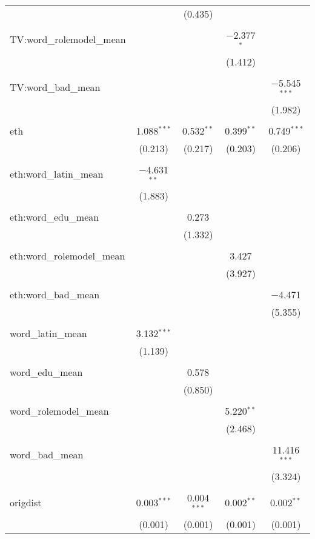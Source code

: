 \begin{table}[!htbp]
\begin{tabular}{@{\extracolsep{-2pt}}lcccc}
  &  & (0.435) &  &  \\ 
  & & & & \\ 
 TV:word\_rolemodel\_mean &  &  & $-$2.377$^{*}$ &  \\ 
  &  &  & (1.412) &  \\ 
  & & & & \\ 
 TV:word\_bad\_mean &  &  &  & $-$5.545$^{***}$ \\ 
  &  &  &  & (1.982) \\ 
  & & & & \\ 
 eth & 1.088$^{***}$ & 0.532$^{**}$ & 0.399$^{**}$ & 0.749$^{***}$ \\ 
  & (0.213) & (0.217) & (0.203) & (0.206) \\ 
  & & & & \\ 
 eth:word\_latin\_mean & $-$4.631$^{**}$ &  &  &  \\ 
  & (1.883) &  &  &  \\ 
  & & & & \\ 
 eth:word\_edu\_mean &  & 0.273 &  &  \\ 
  &  & (1.332) &  &  \\ 
  & & & & \\ 
 eth:word\_rolemodel\_mean &  &  & 3.427 &  \\ 
  &  &  & (3.927) &  \\ 
  & & & & \\ 
 eth:word\_bad\_mean &  &  &  & $-$4.471 \\ 
  &  &  &  & (5.355) \\ 
  & & & & \\ 
 word\_latin\_mean & 3.132$^{***}$ &  &  &  \\ 
  & (1.139) &  &  &  \\ 
  & & & & \\ 
 word\_edu\_mean &  & 0.578 &  &  \\ 
  &  & (0.850) &  &  \\ 
  & & & & \\ 
 word\_rolemodel\_mean &  &  & 5.220$^{**}$ &  \\ 
  &  &  & (2.468) &  \\ 
  & & & & \\ 
 word\_bad\_mean &  &  &  & 11.416$^{***}$ \\ 
  &  &  &  & (3.324) \\ 
  & & & & \\ 
 origdist & 0.003$^{***}$ & 0.004$^{***}$ & 0.002$^{**}$ & 0.002$^{**}$ \\ 
  & (0.001) & (0.001) & (0.001) & (0.001) \\ 

\end{tabular}
\end{table}
